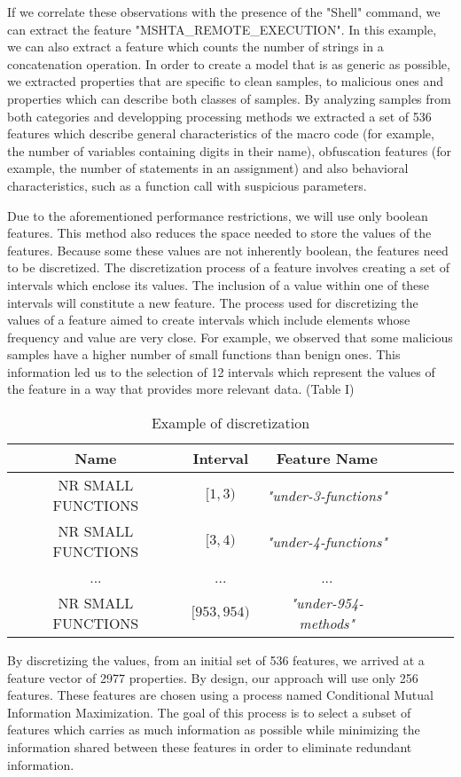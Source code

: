  If we correlate these observations with the presence of  the "Shell" command, we can extract the feature "MSHTA\_REMOTE\_EXECUTION". In this example, we can also extract a feature which counts the number of strings in a concatenation operation. In order to create a model that is as generic as possible, we extracted properties that are specific to clean samples, to malicious ones and properties which can describe both classes of samples. By analyzing samples from both categories and developping processing methods we extracted a set of 536 features which describe general characteristics of the macro code (for example, the number of variables containing digits in their name), obfuscation features (for example, the number of statements in an assignment) and also behavioral characteristics, such as a function call with suspicious parameters.
\par
Due to the aforementioned performance restrictions, we will use only boolean features. This method also reduces the space needed to store the values of the features. Because some these values are not inherently boolean, the features need to be discretized. The discretization process of a feature involves creating a set of intervals which enclose its values. The inclusion of a value within one of these intervals will constitute a new feature. The process used for discretizing the values of a feature aimed to create intervals which include elements whose frequency and value are very close.  For example, we observed that some malicious samples have a higher number of small functions than benign ones. This information led us to the selection of 12 intervals which represent the values of the feature in a way that provides more relevant data. (Table I)
\begin{table}[ht]
    \centering
    \begin{tabular}{| c | c | c | c | c | c | c | }
    \hline
    Name & Interval & Feature Name\\ \hline
    NR SMALL FUNCTIONS & $[1, 3)$ & \textit{"under-3-functions"}  \\ \hline
    NR SMALL FUNCTIONS & $[3, 4)$ & \textit{"under-4-functions"}  \\ \hline
    ... & ... & ... \\ \hline   
    NR SMALL FUNCTIONS & $[953, 954) $ & \textit{"under-954-methods"}  \\ \hline
    \end{tabular}
    \caption{Example of discretization} 
    \label{tab:discretizationeg}
\end{table}
\par
By discretizing the values, from an initial set of 536 features, we arrived at a feature vector of 2977 properties. By design, our approach will use only 256 features. These features are chosen using a process named Conditional Mutual Information Maximization. The goal of this process is to select a subset of features which carries as much information as possible while minimizing the information shared between these features in order to eliminate redundant information.
